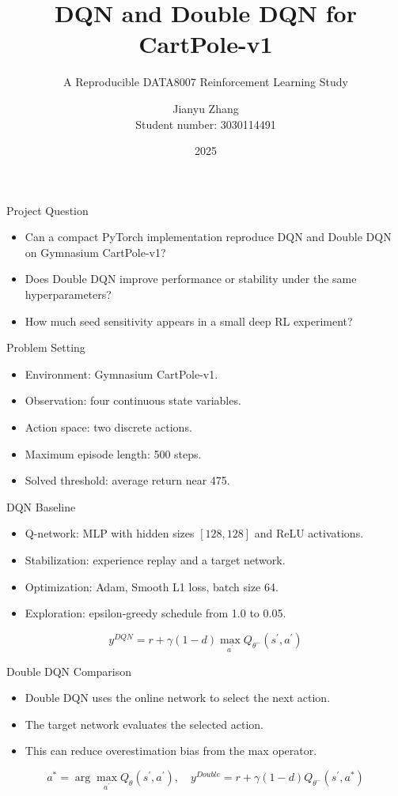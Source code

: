 \documentclass[aspectratio=169]{beamer}
\title{DQN and Double DQN for CartPole-v1}
\subtitle{A Reproducible DATA8007 Reinforcement Learning Study}
\author{Jianyu Zhang\\Student number: 3030114491}
\institute{DATA8007 Foundations of Sequential Decision-Making}
\date{2025}
\begin{document}
\begin{frame}
  \titlepage
\end{frame}

\begin{frame}{Project Question}
\begin{itemize}
  \item Can a compact PyTorch implementation reproduce DQN and Double DQN on Gymnasium CartPole-v1?
  \item Does Double DQN improve performance or stability under the same hyperparameters?
  \item How much seed sensitivity appears in a small deep RL experiment?
\end{itemize}
\end{frame}

\begin{frame}{Problem Setting}
\begin{itemize}
  \item Environment: Gymnasium CartPole-v1.
  \item Observation: four continuous state variables.
  \item Action space: two discrete actions.
  \item Maximum episode length: 500 steps.
  \item Solved threshold: average return near 475.
\end{itemize}
\end{frame}

\begin{frame}{DQN Baseline}
\begin{itemize}
  \item Q-network: MLP with hidden sizes $[128,128]$ and ReLU activations.
  \item Stabilization: experience replay and a target network.
  \item Optimization: Adam, Smooth L1 loss, batch size 64.
  \item Exploration: epsilon-greedy schedule from 1.0 to 0.05.
\end{itemize}
\[ y^{DQN}=r+\gamma(1-d)\max_{a^{\prime}}Q_{\theta^-}(s^{\prime},a^{\prime}) \]
\end{frame}

\begin{frame}{Double DQN Comparison}
\begin{itemize}
  \item Double DQN uses the online network to select the next action.
  \item The target network evaluates the selected action.
  \item This can reduce overestimation bias from the max operator.
\end{itemize}
\[ a^*=\arg\max_{a^{\prime}}Q_{\theta}(s^{\prime},a^{\prime}),\quad y^{Double}=r+\gamma(1-d)Q_{\theta^-}(s^{\prime},a^*) \]
\end{frame}
\end{document}
